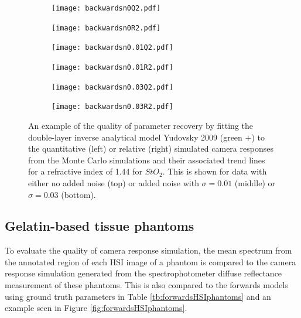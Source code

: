 \begin{figure}[h!]
    \centering
    \begin{subfigure}{0.49\textwidth}
        \texttt{[image: backwardsn0Q2.pdf]}
        \caption{}
        \label{fig:backwardsn0Q2}
    \end{subfigure}
    \begin{subfigure}{0.49\textwidth}
        \texttt{[image: backwardsn0R2.pdf]}
        \caption{}
        \label{fig:backwardsn0R2}
    \end{subfigure}
    \begin{subfigure}{0.49\textwidth}
        \texttt{[image: backwardsn0.01Q2.pdf]}
        \caption{}
        \label{fig:backwardsn0.01Q2}
    \end{subfigure}
    \begin{subfigure}{0.49\textwidth}
        \texttt{[image: backwardsn0.01R2.pdf]}
        \caption{}
        \label{fig:backwardsm0.01R2}
    \end{subfigure}
    \begin{subfigure}{0.49\textwidth}
        \texttt{[image: backwardsn0.03Q2.pdf]}
        \caption{}
        \label{fig:backwardsn0.03Q2}
    \end{subfigure}
    \begin{subfigure}{0.49\textwidth}
        \texttt{[image: backwardsn0.03R2.pdf]}
        \caption{}
        \label{fig:backwardsm0.03R2}
    \end{subfigure}
    \caption{An example of the quality of parameter recovery by fitting the double-layer inverse analytical model Yudovsky 2009 (\textcolor{MyGreen}{green $+$}) to the quantitative (left) or relative (right) simulated camera responses from the Monte Carlo simulations and their associated trend lines for a refractive index of 1.44 for $StO_2$. This is shown for data with either no added noise (top) or added noise with $\sigma = 0.01$ (middle) or $\sigma = 0.03$ (bottom).}
    \label{fig:backwardsHSIMC2}
\end{figure}

\subsection{Gelatin-based tissue phantoms}
To evaluate the quality of camera response simulation, the mean spectrum from the annotated region of each HSI image of a phantom is compared to the camera response simulation generated from the spectrophotometer diffuse reflectance measurement of these phantoms. This is also compared to the forwards models using ground truth parameters in Table \ref{tb:forwardsHSIphantoms} and an example seen in Figure \ref{fig:forwardsHSIphantoms}. 

